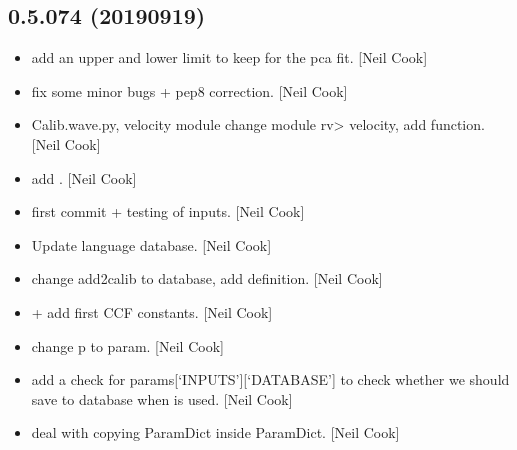 \documentclass[a4paper,10pt,english]{report}
\begin{document}
\subsection{0.5.074 (2019\sphinxhyphen{}09\sphinxhyphen{}19)}
\label{\detokenize{misc/changelog:id88}}\begin{itemize}
\item {} 
 \sphinxhyphen{} add an upper and lower limit to keep for
the pca fit. {[}Neil Cook{]}

\item {} 
 \sphinxhyphen{} fix some minor bugs + pep8 correction.
{[}Neil Cook{]}

\item {} 
Calib.wave.py, velocity module \sphinxhyphen{} change module rv\textendash{}\textgreater{} velocity, add
 function. {[}Neil Cook{]}

\item {} 
 \sphinxhyphen{} add . {[}Neil Cook{]}

\item {} 
 \sphinxhyphen{} first commit + testing of inputs.
{[}Neil Cook{]}

\item {} 
Update language database. {[}Neil Cook{]}

\item {} 
 \sphinxhyphen{} change \textendash{}add2calib to
\textendash{}database, add  definition. {[}Neil Cook{]}

\item {} 
 +  \sphinxhyphen{} add
first CCF constants. {[}Neil Cook{]}

\item {} 
 \sphinxhyphen{} change p to param. {[}Neil Cook{]}

\item {} 
 \sphinxhyphen{} add a check for
params{[}‘INPUTS’{]}{[}‘DATABASE’{]} to check whether we should save to
database when  is used. {[}Neil Cook{]}

\item {} 
 \sphinxhyphen{} deal with copying ParamDict inside
ParamDict. {[}Neil Cook{]}


\end{itemize}
\end{document}

